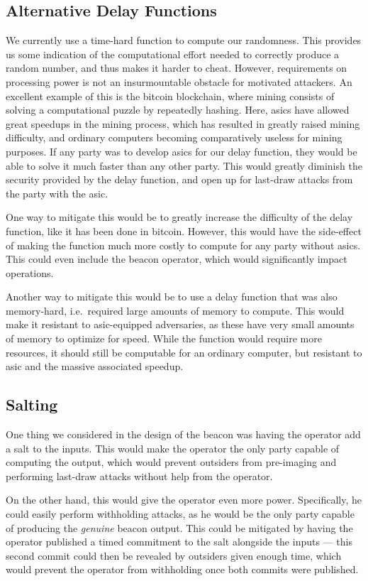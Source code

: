 \subsection{Alternative Delay Functions}
We currently use a time-hard function to compute our randomness. This provides us some indication of the computational effort needed to correctly produce a random number, and thus makes it harder to cheat.
However, requirements on processing power is not an insurmountable obstacle for motivated attackers. An excellent example of this is the bitcoin blockchain, where mining consists of solving a computational puzzle by repeatedly hashing. Here, \glspl{asic} have allowed great speedups in the mining process, which has resulted in greatly raised mining difficulty, and ordinary computers becoming comparatively useless for mining purposes.
If any party was to develop \glspl{asic} for our delay function, they would be able to solve it much faster than any other party. This would greatly diminish the security provided by the delay function, and open up for last-draw attacks from the party with the \gls{asic}.

One way to mitigate this would be to greatly increase the difficulty of the delay function, like it has been done in bitcoin. However, this would have the side-effect of making the function much more costly to compute for any party without \glspl{asic}. This could even include the beacon operator, which would significantly impact operations.

Another way to mitigate this would be to use a delay function that was also memory-hard, i.e.\ required large amounts of memory to compute. This would make it resistant to \gls{asic}-equipped adversaries, as these have very small amounts of memory to optimize for speed. While the function would require more resources, it should still be computable for an ordinary computer, but resistant to \gls{asic} and the massive associated speedup.

\subsection{Salting}

One thing we considered in the design of the beacon was having the operator add a salt to the inputs.
This would make the operator the only party capable of computing the output, which would prevent outsiders from pre-imaging and performing last-draw attacks without help from the operator.

On the other hand, this would give the operator even more power. Specifically, he could easily perform withholding attacks, as he would be the only party capable of producing the \textit{genuine} beacon output. This could be mitigated by having the operator published a timed commitment to the salt alongside the inputs --- this second commit could then be revealed by outsiders given enough time, which would prevent the operator from withholding once both commits were published.

